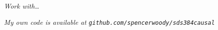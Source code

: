 \documentclass[11pt,letter]{article}
\begin{document}
\maketitle

\newpage


\emph{Work with\ldots}

\emph{My own code is available at
  \texttt{github.com/spencerwoody/sds384causal}}
















% 
\pagebreak





% 
 

\nocite{peel2010impact}



\begin{raggedright}

\end{raggedright}


\end{document}
